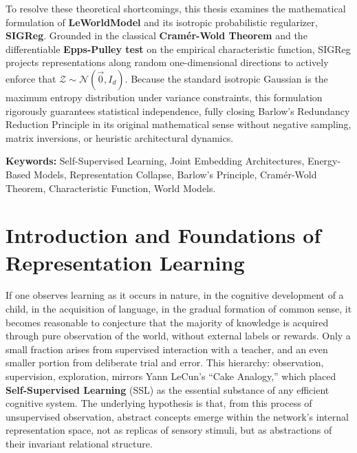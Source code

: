 \documentclass[11pt, oneside, openany]{book}
\begin{document}
To resolve these theoretical shortcomings, this thesis examines the mathematical formulation of \textbf{LeWorldModel} and its isotropic probabilistic regularizer, \textbf{SIGReg}. Grounded in the classical \textbf{Cram\'er-Wold Theorem} and the differentiable \textbf{Epps-Pulley test} on the empirical characteristic function, SIGReg projects representations along random one-dimensional directions to actively enforce that $\mathcal{Z} \sim \mathcal{N}(\vec{0}, I_d)$. Because the standard isotropic Gaussian is the maximum entropy distribution under variance constraints, this formulation rigorously guarantees statistical independence, fully closing Barlow's Redundancy Reduction Principle in its original mathematical sense without negative sampling, matrix inversions, or heuristic architectural dynamics.

\vspace{0.8cm}
\noindent\textbf{Keywords:} Self-Supervised Learning, Joint Embedding Architectures, Energy-Based Models, Representation Collapse, Barlow's Principle, Cram\'er-Wold Theorem, Characteristic Function, World Models.

\tableofcontents

\mainmatter

\chapter[Introduction and Foundations of Representation Learning]{Introduction and Foundations of\\ Representation Learning}
\label{chap:1}

If one observes learning as it occurs in nature, in the cognitive development of a child, in the acquisition of language, in the gradual formation of common sense, it becomes reasonable to conjecture that the majority of knowledge is acquired through pure observation of the world, without external labels or rewards. Only a small fraction arises from supervised interaction with a teacher, and an even smaller portion from deliberate trial and error. This hierarchy: observation, supervision, exploration, mirrors Yann LeCun's ``Cake Analogy,'' which placed \textbf{Self-Supervised Learning} (SSL) as the essential substance of any efficient cognitive system. The underlying hypothesis is that, from this process of unsupervised observation, abstract concepts emerge within the network's internal representation space, not as replicas of sensory stimuli, but as abstractions of their invariant relational structure.
\end{document}

